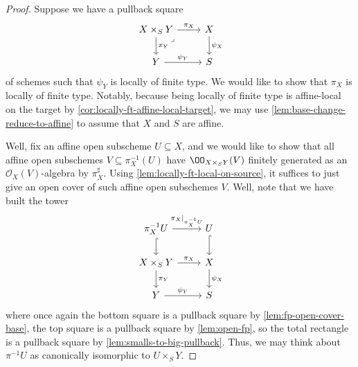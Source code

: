 \documentclass[../notes.tex]{subfiles}
\begin{document}
\begin{proof}
	Suppose we have a pullback square
	\[\begin{tikzcd}
		{X\times_SY} & X \\
		Y & S
		\arrow["{\psi_Y}", from=2-1, to=2-2]
		\arrow["{\pi_X}", from=1-1, to=1-2]
		\arrow["{\pi_Y}", from=1-1, to=2-1]
		\arrow["{\psi_X}", from=1-2, to=2-2]
		\arrow["\lrcorner"{anchor=center, pos=0.125}, draw=none, from=1-1, to=2-2]
	\end{tikzcd}\]
	of schemes such that $\psi_Y$ is locally of finite type. We would like to show that $\pi_X$ is locally of finite type. Notably, because being locally of finite type is affine-local on the target by \autoref{cor:locally-ft-affine-local-target}, we may use \autoref{lem:base-change-reduce-to-affine} to assume that $X$ and $S$ are affine.

	Well, fix an affine open subscheme $U\subseteq X$, and we would like to show that all affine open subschemes $V\subseteq\pi_X^{-1}(U)$ have $\OO_{X\times_SY}(V)$ finitely generated as an $\mathcal O_X(V)$-algebra by $\pi_X^\sharp$. Using \autoref{lem:locally-ft-local-on-source}, it suffices to just give an open cover of such affine open subschemes $V$. Well, note that we have built the tower
	\[\begin{tikzcd}
		{\pi_X^{-1}U} & U \\
		{X\times_SY} & X \\
		Y & S
		\arrow["{\psi_Y}", from=3-1, to=3-2]
		\arrow["{\psi_X}", from=2-2, to=3-2]
		\arrow["{\pi_X}", from=2-1, to=2-2]
		\arrow["{\pi_Y}", from=2-1, to=3-1]
		\arrow[hook, from=1-2, to=2-2]
		\arrow[hook, from=1-1, to=2-1]
		\arrow["{\pi_X|_{\pi_X^{-1}U}}", from=1-1, to=1-2]
	\end{tikzcd}\]
	where once again the bottom square is a pullback square by \autoref{lem:fp-open-cover-base}, the top square is a pullback square by \autoref{lem:open-fp}, so the total rectangle is a pullback square by \autoref{lem:smalls-to-big-pullback}. Thus, we may think about $\pi^{-1}U$ as canonically isomorphic to $U\times_SY$.


\end{proof}
\end{document}
